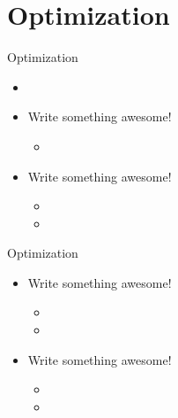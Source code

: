 \section{Optimization}




\begin{frame}{Optimization}{}
\begin{itemize}
	\item<1-> 
	\item<1-> Write something awesome!
	\begin{itemize}
		\item<1-> 
	\end{itemize}
	\item<1->  Write something awesome!
	\begin{itemize}
		\item<1-> 
		\item<1-> 
	\end{itemize}
\end{itemize}
%  
\end{frame}




\begin{frame}{Optimization}{}
\begin{itemize}
		\item<1-> Write something awesome!
	\begin{itemize}
		\item<1-> 
		\item<1-> 
	\end{itemize}
		\item<1-> Write something awesome!
	\begin{itemize}
		\item<1-> 
		\item<1-> 
	\end{itemize}
\end{itemize}
%  


\end{frame}

